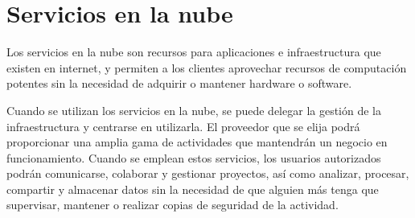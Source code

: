 \section{Servicios en la nube}
Los servicios en la nube son recursos para aplicaciones e infraestructura que existen en internet, y permiten a los clientes aprovechar recursos de computación potentes sin la necesidad de adquirir o mantener hardware o software.

Cuando se utilizan los servicios en la nube, se puede delegar la gestión de la infraestructura y centrarse en utilizarla. El proveedor que se elija podrá proporcionar una amplia gama de actividades que mantendrán un negocio en funcionamiento. Cuando se emplean estos servicios, los usuarios autorizados podrán comunicarse, colaborar y gestionar proyectos, así como analizar, procesar, compartir y almacenar datos sin la necesidad de que alguien más tenga que supervisar, mantener o realizar copias de seguridad de la actividad.
    
    